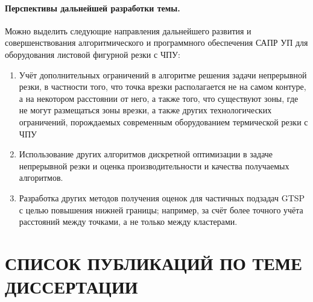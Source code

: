 \documentclass[14pt]{extarticle}
\begin{document}
\paragraph*{Перспективы дальнейшей разработки темы.}
Можно выделить следующие направления дальнейшего развития и совершенствования алгоритмического и
программного обеспечения САПР УП для оборудования листовой фигурной резки с ЧПУ:

\begin{enumerate}
    \item 
    Учёт дополнительных ограничений в алгоритме решения задачи
    непрерывной резки, в частности того, 
    что точка врезки располагается не на самом контуре,
    а на некотором расстоянии от него, а также того, что
    существуют зоны, где не могут размещаться зоны врезки,
    а также других технологических ограничений,
    порождаемых современным оборудованием термической резки с ЧПУ
    \item 
    Использование других алгоритмов дискретной оптимизации в задаче
    непрерывной резки и оценка производительности и качества получаемых 
    алгоритмов.
    \item 
    Разработка других методов получения оценок для частичных подзадач GTSP
    с целью повышения нижней границы; 
    например, за счёт более точного учёта расстояний между точками,
    а не только между кластерами.
\end{enumerate}

\section*{СПИСОК ПУБЛИКАЦИЙ ПО ТЕМЕ ДИССЕРТАЦИИ}

\printbibliography[heading=none]
\nocite{*}
\end{document}
